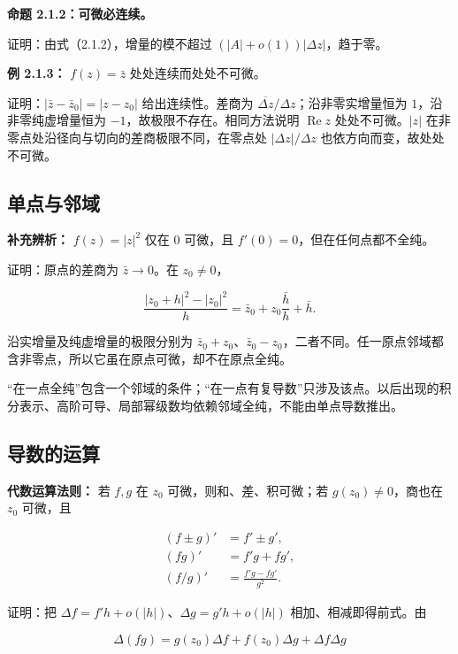 \documentclass[11pt,a4paper]{article}
\begin{document}
\textbf{命题 2.1.2：可微必连续。}

证明：由式（2.1.2），增量的模不超过 \((|A|+o(1))|\Delta z|\)，趋于零。

\textbf{例 2.1.3：} \(f(z)=\bar z\) 处处连续而处处不可微。

证明：\(|\bar z-\bar z_0|=|z-z_0|\) 给出连续性。差商为
\(\overline{\Delta z}/\Delta z\)；沿非零实增量恒为
\(1\)，沿非零纯虚增量恒为 \(-1\)，故极限不存在。相同方法说明
\(\operatorname{Re}z\) 处处不可微。\(|z|\)
在非零点处沿径向与切向的差商极限不同，在零点处 \(|\Delta z|/\Delta z\)
也依方向而变，故处处不可微。

\subsection{单点与邻域}\label{ch02-s1-ux5355ux70b9ux4e0eux90bbux57df}

\textbf{补充辨析：} \(f(z)=|z|^2\) 仅在 \(0\) 可微，且
\(f'(0)=0\)，但在任何点都不全纯。

证明：原点的差商为 \(\bar z\to0\)。在 \(z_0\ne0\)，

\[
\frac{|z_0+h|^2-|z_0|^2}{h}
=\bar z_0+z_0\frac{\bar h}{h}+\bar h.
\]

沿实增量及纯虚增量的极限分别为
\(\bar z_0+z_0\)、\(\bar z_0-z_0\)，二者不同。任一原点邻域都含非零点，所以它虽在原点可微，却不在原点全纯。

``在一点全纯''包含一个邻域的条件；``在一点有复导数''只涉及该点。以后出现的积分表示、高阶可导、局部幂级数均依赖邻域全纯，不能由单点导数推出。

\subsection{导数的运算}\label{ch02-s1-ux5bfcux6570ux7684ux8fd0ux7b97}

\textbf{代数运算法则：} 若 \(f,g\) 在 \(z_0\) 可微，则和、差、积可微；若
\(g(z_0)\ne0\)，商也在 \(z_0\) 可微，且

\[
\begin{aligned}
(f\pm g)'&=f'\pm g',\\
(fg)'&=f'g+fg',\\
(f/g)'&=\frac{f'g-fg'}{g^2}.
\end{aligned}
\]

证明：把 \(\Delta f=f'h+o(|h|)\)、\(\Delta g=g'h+o(|h|)\)
相加、相减即得前式。由

\[
\Delta(fg)=g(z_0)\Delta f+f(z_0)\Delta g+\Delta f\Delta g
\]
\end{document}
